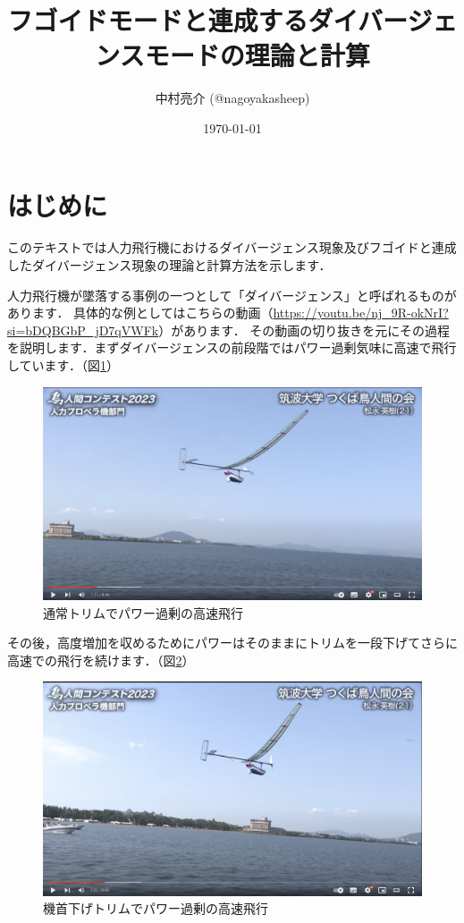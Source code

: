 \documentclass{jarticle}
\title{フゴイドモードと連成するダイバージェンスモードの理論と計算}
\author{中村亮介 (@nagoyakasheep) }
\date{\today} %
\begin{document}
\maketitle

\section{はじめに}

このテキストでは人力飛行機におけるダイバージェンス現象及びフゴイドと連成したダイバージェンス現象の理論と計算方法を示します．

人力飛行機が墜落する事例の一つとして「ダイバージェンス」と呼ばれるものがあります．
具体的な例としてはこちらの動画（\url{https://youtu.be/nj_9R-okNrI?si=bDQBGbP_jD7qVWFk}）があります．
その動画の切り抜きを元にその過程を説明します．まずダイバージェンスの前段階ではパワー過剰気味に高速で飛行しています．（図\ref{tsukuba1}）
\begin{figure}[H]
    \centering
    \includegraphics[width=0.7\linewidth]{image/tsukuba0111.png}
    \caption{通常トリムでパワー過剰の高速飛行}
    \label{tsukuba1}
\end{figure}
その後，高度増加を収めるためにパワーはそのままにトリムを一段下げてさらに高速での飛行を続けます．（図\ref{tsukuba2}）
\begin{figure}[H]
    \centering
    \includegraphics[width=0.7\linewidth]{image/tsukuba0122.png}
    \caption{機首下げトリムでパワー過剰の高速飛行}
    \label{tsukuba2}
\end{figure}
\end{document}
